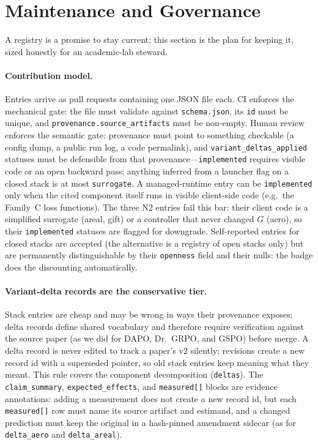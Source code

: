 \section{Maintenance and Governance}
\label{sec:p6-governance}

A registry is a promise to stay current; this section is the plan for keeping
it, sized honestly for an academic-lab steward.

\paragraph{Contribution model.}
Entries arrive as pull requests containing one JSON file each. CI enforces the
mechanical gate: the file must validate against \texttt{schema.json}, its
\texttt{id} must be unique, and \texttt{provenance.source_artifacts} must be
non-empty. Human review enforces the semantic gate: provenance must point to
something checkable (a config dump, a public run log, a code permalink), and
\texttt{variant_deltas_applied} statuses must be defensible from that
provenance---\texttt{implemented} requires visible code or an open backward
pass; anything inferred from a launcher flag on a closed stack is at most
\texttt{surrogate}. A managed-runtime entry can be \texttt{implemented} only
when the cited component itself runs in visible client-side code (e.g.\ the
Family~C loss functions). The three N2 entries fail this bar: their client
code is a simplified surrogate (areal, gift) or a controller that never
changed $G$ (aero), so their \texttt{implemented} statuses are flagged for
downgrade. Self-reported entries for closed stacks are accepted (the
alternative is a registry of open stacks only) but are permanently
distinguishable by their \texttt{openness} field and their nulls: the badge
does the discounting automatically.

\paragraph{Variant-delta records are the conservative tier.}
Stack entries are cheap and may be wrong in ways their provenance exposes;
delta records define shared vocabulary and therefore require verification
against the source paper (as we did for DAPO, Dr.~GRPO, and GSPO) before
merge. A delta record is never edited to track a paper's v2 silently;
revisions create a new record id with a superseded pointer, so old stack
entries keep meaning what they meant. This rule covers the component
decomposition (\texttt{deltas}). The \texttt{claim\_summary},
\texttt{expected\_effects}, and \texttt{measured[]} blocks are evidence
annotations: adding a measurement does not create a new record id, but each
\texttt{measured[]} row must name its source artifact and estimand, and a
changed prediction must keep the original in a hash-pinned amendment sidecar
(as for \texttt{delta\_aero} and \texttt{delta\_areal}).

